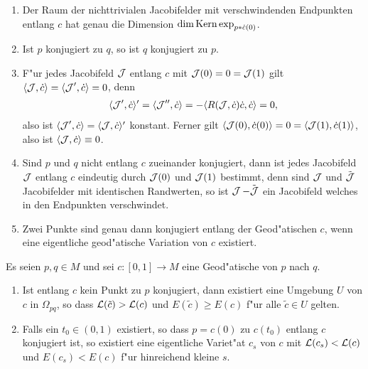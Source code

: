 \begin{bem}\begin{enumerate}[label=\arabic*),leftmargin=*]
  \item
    Der Raum der nichttrivialen Jacobifelder mit verschwindenden Endpunkten entlang $c$ hat genau die Dimension $\operatorname{dim} \operatorname{Kern} \exp_{p*\dot{c}(0)}$.
  \item
    Ist $p$ konjugiert zu $q$, so ist $q$ konjugiert zu $p$.
  \item
    F"ur jedes Jacobifeld $\operatorname{\mathcal{J}}$ entlang $c$ mit $\operatorname{\mathcal{J}}(0) = 0 = \operatorname{\mathcal{J}}(1)$ gilt $\langle \operatorname{\mathcal{J}}, \dot c \rangle = \langle \operatorname{\mathcal{J}}', \dot c \rangle = 0$, denn
    \begin{align*}
      \langle \operatorname{\mathcal{J}}', \dot c \rangle' = \langle \operatorname{\mathcal{J}}'', \dot c \rangle = - \langle R(\operatorname{\mathcal{J}}, \dot c) \dot c, \dot c \rangle = 0,
    \end{align*}
    also ist $\langle \operatorname{\mathcal{J}}', \dot c \rangle = \langle \operatorname{\mathcal{J}}, \dot c \rangle'$ konstant. Ferner gilt $\langle \operatorname{\mathcal{J}}(0), \dot c (0) \rangle = 0 = \langle \operatorname{\mathcal{J}}(1), \dot c(1) \rangle$, also ist $\langle \operatorname{\mathcal{J}}, \dot c \rangle \equiv 0$.
  \item
    Sind $p$ und $q$ nicht entlang $c$ zueinander konjugiert, dann ist jedes Jacobifeld $\operatorname{\mathcal{J}}$ entlang $c$ eindeutig durch $\operatorname{\mathcal{J}}(0)$ und $\operatorname{\mathcal{J}}(1)$ bestimmt, denn sind $\operatorname{\mathcal{J}}$ und $\tilde{\operatorname{\mathcal{J}}}$ Jacobifelder mit identischen Randwerten, so ist $\operatorname{\mathcal{J}} - \tilde{\operatorname{\mathcal{J}}}$ ein Jacobifeld welches in den Endpunkten verschwindet.
  \item
    Zwei Punkte sind genau dann konjugiert entlang der Geod"atischen $c$, wenn eine eigentliche geod"atische Variation von $c$ existiert.
  \end{enumerate}\end{bem}

\begin{Satz}\label{satz-9-8}
  Es seien $p, q \in M$ und sei $c: [0,1] \to M$ eine Geod"atische von $p$ nach $q$.\begin{enumerate}[label=(\roman*),widest=ii]
  \item
    Ist entlang $c$ kein Punkt zu $p$ konjugiert, dann existiert eine Umgebung $U$ von $c$ in $\Omega_{pq}$, so dass $\operatorname{\mathcal{L}}(\tilde c) > \operatorname{\mathcal{L}}(c)$ und $E(\tilde c) \ge E(c)$ f"ur alle $\tilde c \in U$ gelten.
  \item
    Falls ein $t_0 \in (0,1)$ existiert, so dass $p = c(0)$ zu $c(t_0)$ entlang $c$ konjugiert ist, so existiert eine eigentliche Variet"at $c_s$ von $c$ mit $\operatorname{\mathcal{L}}(c_s) < \operatorname{\mathcal{L}}(c)$ und $E(c_s) < E(c)$ f"ur hinreichend kleine $s$.
  \end{enumerate}\end{Satz}

